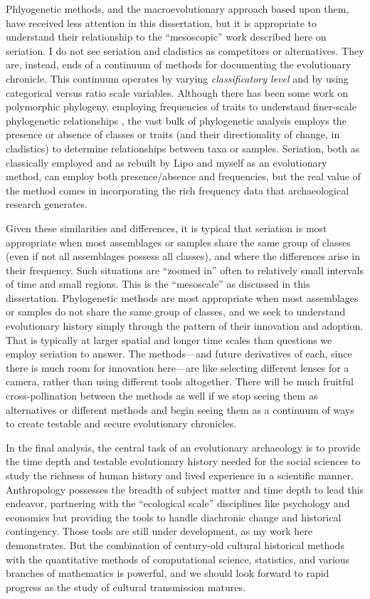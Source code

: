 Phlyogenetic methods, and the macroevolutionary approach based upon them, have received less attention in this dissertation, but it is appropriate to understand their relationship to the ``mesoscopic'' work described here on seriation.  I do not see seriation and cladistics as competitors or alternatives.  They are, instead, ends of a continuum of methods for documenting the evolutionary chronicle.  This continuum operates by varying \emph{classificatory level} and by using categorical versus ratio scale variables.  Although there has been some work on polymorphic phylogeny, employing frequencies of traits to understand finer-scale phylogenetic relationships \citep{Wiens1999}, the vast bulk of phylogenetic analysis employs the presence or absence of classes or traits (and their directionality of change, in cladistics) to determine relationships between taxa or samples.  Seriation, both as classically employed and as rebuilt by Lipo and myself as an evolutionary method, can employ both presence/absence and frequencies, but the real value of the method comes in incorporating the rich frequency data that archaeological research generates.  

Given these similarities and differences, it is typical that seriation is most appropriate when most assemblages or samples share the same group of classes (even if not all assemblages possess all classes), and where the differences arise in their frequency.  Such situations are ``zoomed in'' often to relatively small intervals of time and small regions.  This is the ``mesoscale'' as discussed in this dissertation.  Phylogenetic methods are most appropriate when most assemblages or samples do not share the same group of classes, and we seek to understand evolutionary history simply through the pattern of their innovation and adoption.  That is typically at larger spatial and longer time scales than questions we employ seriation to answer.  The methods---and future derivatives of each, since there is much room for innovation here---are like selecting different lenses for a camera, rather than using different tools altogether.  There will be much fruitful cross-pollination between the methods as well if we stop seeing them as alternatives or different methods and begin seeing them as a continuum of ways to create testable and secure evolutionary chronicles.

In the final analysis, the central task of an evolutionary archaeology is to provide the time depth and testable evolutionary history needed for the social sciences to study the richness of human history and lived experience in a scientific manner.  Anthropology possesses the breadth of subject matter and time depth to lead this endeavor, partnering with the ``ecological scale'' disciplines like psychology and economics but providing the tools to handle diachronic change and historical contingency.  Those tools are still under development, as my work here demonstrates.  But the combination of century-old cultural historical methods with the quantitative methods of computational science, statistics, and various branches of mathematics is powerful, and we should look forward to rapid progress as the study of cultural transmission matures.  

